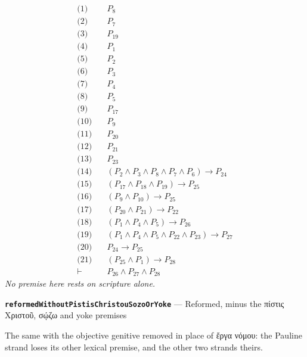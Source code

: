 \documentclass[11pt]{article}
\begin{document}
\begin{align*}
  \text{(1)} \quad & P_{8} \\
  \text{(2)} \quad & P_{7} \\
  \text{(3)} \quad & P_{19} \\
  \text{(4)} \quad & P_{1} \\
  \text{(5)} \quad & P_{2} \\
  \text{(6)} \quad & P_{3} \\
  \text{(7)} \quad & P_{4} \\
  \text{(8)} \quad & P_{5} \\
  \text{(9)} \quad & P_{17} \\
  \text{(10)} \quad & P_{9} \\
  \text{(11)} \quad & P_{20} \\
  \text{(12)} \quad & P_{21} \\
  \text{(13)} \quad & P_{23} \\
  \text{(14)} \quad & (P_{2} \land P_{3} \land P_{8} \land P_{7} \land P_{6}) \rightarrow P_{24} \\
  \text{(15)} \quad & (P_{17} \land P_{18} \land P_{19}) \rightarrow P_{25} \\
  \text{(16)} \quad & (P_{9} \land P_{10}) \rightarrow P_{25} \\
  \text{(17)} \quad & (P_{20} \land P_{21}) \rightarrow P_{22} \\
  \text{(18)} \quad & (P_{1} \land P_{4} \land P_{5}) \rightarrow P_{26} \\
  \text{(19)} \quad & (P_{1} \land P_{4} \land P_{5} \land P_{22} \land P_{23}) \rightarrow P_{27} \\
  \text{(20)} \quad & P_{24} \rightarrow P_{25} \\
  \text{(21)} \quad & (P_{25} \land P_{1}) \rightarrow P_{28} \\
  \vdash \quad & P_{26} \land P_{27} \land P_{28}
\end{align*}
\emph{No premise here rests on scripture alone.}
\par\medskip\noindent\textbf{\texttt{reformed\allowbreak{}Without\allowbreak{}Pistis\allowbreak{}Christou\allowbreak{}Sozo\allowbreak{}Or\allowbreak{}Yoke}} --- Reformed, minus the πίστις Χριστοῦ, σῴζω and yoke premises\par\nobreak\noindent
The same with the objective genitive removed in place of ἔργα νόμου: the Pauline strand loses its other lexical premise, and the other two strands theirs.
\end{document}
